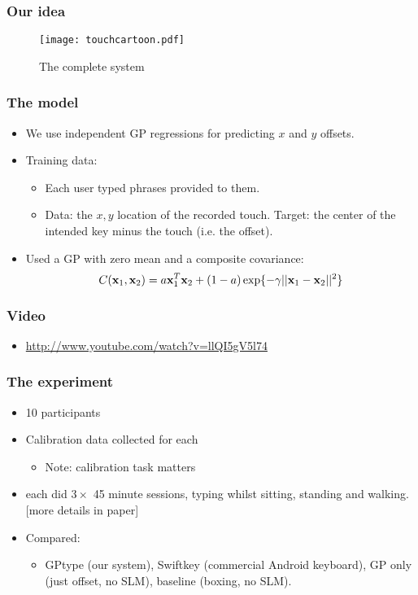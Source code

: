\begin{frame}
	\frametitle{Our idea}
	\begin{figure}[tbh]
		\centering\texttt{[image: touchcartoon.pdf]}
		\centering\caption{\label{fig:touchcartoon}The complete system}
	\end{figure}
\end{frame}

\begin{frame}
	\frametitle{The model}
	\begin{itemize}
		\item We use independent GP regressions for predicting $x$ and $y$ offsets.
		\item Training data:
		\begin{itemize}
			\item Each user typed phrases provided to them.
			\item Data: the $x,y$ location of the recorded touch. Target: the center of the intended key minus the touch (i.e. the offset).
		\end{itemize}
		\item<2-> Used a \ac{GP} with zero mean and a composite covariance:
		\[
			C(\mathbf{x}_1,\mathbf{x}_2) = a \mathbf{x}_1^T\mathbf{x}_2 + (1-a)\exp \{ -\gamma || \mathbf{x}_1 - \mathbf{x}_2 ||^2 \}
		\]
	\end{itemize}
\end{frame}

\begin{frame}
	\frametitle{Video}
	\begin{itemize}
		\item \url{http://www.youtube.com/watch?v=llQI5gV5l74}
	\end{itemize}
\end{frame}

\begin{frame}
	\frametitle{The experiment}
	\begin{itemize}
		\item 10 participants
		\item Calibration data collected for each
		\begin{itemize}
			\item Note: calibration task matters
		\end{itemize}
		\item each did $3\times$ 45 minute sessions, typing whilst sitting, standing and walking. [more details in paper]
		\item Compared:
		\begin{itemize}
			\item GPtype (our system), Swiftkey (commercial Android keyboard), GP only (just offset, no \ac{SLM}), baseline (boxing, no \ac{SLM}).
		\end{itemize}
	\end{itemize}
\end{frame}

